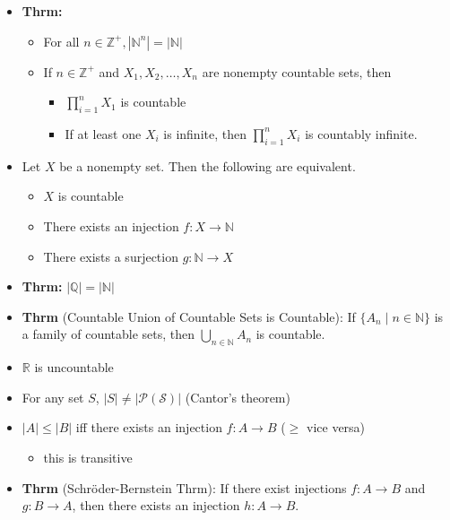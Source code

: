 \documentclass[11pt]{article}
\theoremstyle{definition}
\newcommand{\bb}[1]{\mathbb{#1}}
\begin{document}
\begin{itemize}
\begin{itemize}
    \end{itemize}
    \item \textbf{Thrm:} 
    \begin{itemize}
        \item For all $n\in\bb{Z}^+, |\bb{N}^n|=|\bb{N}|$
        \item If $n\in\bb{Z}^+$ and $X_1,X_2,\dots,X_n$ are nonempty countable sets, then
        \begin{itemize}
            \item $\prod_{i=1}^{n}X_1$ is countable
            \item If at least one $X_i$ is infinite, then $\prod_{i=1}^{n}X_i$ is countably infinite.
        \end{itemize}
    \end{itemize}
    \item Let $X$ be a nonempty set. Then the following are equivalent.
    \begin{itemize}
        \item $X$ is countable
        \item There exists an injection $f: X\rightarrow \bb{N}$
        \item There exists a surjection $g: \bb{N} \rightarrow X$
    \end{itemize}
    \item \textbf{Thrm:} $|\bb{Q}| = |\bb{N}|$
    \item \textbf{Thrm} (Countable Union of Countable Sets is Countable): If $\{A_n \mid n\in\bb{N}\}$ is a family of countable sets, then $\bigcup_{n\in\bb{N}}A_n$ is countable.
    \item $\bb{R}$ is uncountable
    \item For any set $S$, $|S| \ne |\mathcal{P{(S)}}|$ (Cantor's theorem)
    \item $|A| \le |B|$ iff there exists an injection $f:A\rightarrow B$ ($\ge$ vice versa)
    \begin{itemize}
        \item this is transitive
    \end{itemize}
    \item \textbf{Thrm} (Schr\"oder-Bernstein Thrm): If there exist injections $f:A\rightarrow B$ and $g:B\rightarrow A$, then there exists an injection $h:A\rightarrow B$.
\end{itemize}
\end{document}
